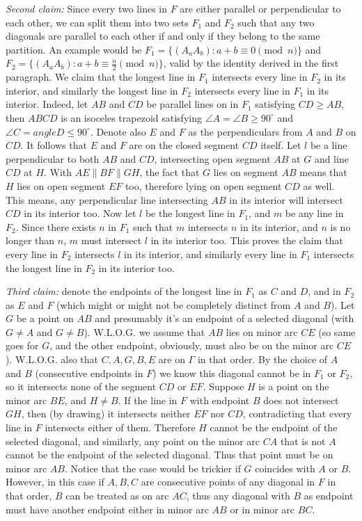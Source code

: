\documentclass[11pt,a4paper]{article}
\begin{document}
\begin{itemize}
\emph{Second claim:}
Since every two lines in $F$ are either parallel or perpendicular to each other, 
we can split them into two sets $F_1$ and $F_2$ such that any two diagonals are parallel to each other if and only if they belong to the same partition. 
An example would be $F_1=\{(A_aA_b): a+b\equiv 0\pmod{n}\}$ and $F_2=\{(A_aA_b): a+b\equiv \frac n2\pmod{n}\}$, 
valid by the identity derived in the first paragraph. 
We claim that the longest line in $F_1$ intersects every line in $F_2$ in its interior, and similarly the longest line in $F_2$ intersects every line in $F_1$ in its interior. 
Indeed, let $AB$ and $CD$ be parallel lines on in $F_1$ satisfying $CD\ge AB$, 
then $ABCD$ is an isoceles trapezoid satisfying $\angle A=\angle B\ge 90^{\circ}$ and $\angle C=angle D\le 90^{\circ}$. 
Denote also $E$ and $F$ as the perpendiculars from $A$ and $B$ on $CD$. It follows that $E$ and $F$ are on the closed segment $CD$ itself. 
Let $l$ be a line perpendicular to both $AB$ and $CD$, intersecting open segment $AB$ at $G$ and line $CD$ at $H$. 
With $AE\parallel BF\parallel GH$, the fact that $G$ lies on segment $AB$ means that $H$ lies on open segment $EF$ too, 
therefore lying on open segment $CD$ as well. 
This means, any perpendicular line intersecting $AB$ in its interior will intersect $CD$ in its interior too. 
Now let $l$ be the longest line in $F_1$, and $m$ be any line in $F_2$. Since there exists $n$ in $F_1$ such that $m$ intersects $n$ in its interior, and $n$ is no longer than $n$, $m$ must intersect $l$ in its interior too. This proves the claim that every line in $F_2$ intersects $l$ in its interior, and similarly every line in $F_1$ intersects the longest line in $F_2$ in its interior too. 

\emph{Third claim:} 
denote the endpoints of the longest line in $F_1$ as $C$ and $D$, and in $F_2$ as $E$ and $F$ (which might or might not be completely distinct from $A$ and $B$). 
Let $G$ be a point on $AB$ and presumably it's an endpoint of a selected diagonal (with $G\neq A$ and $G\neq B$). 
W.L.O.G. we assume that $AB$ lies on minor arc $CE$ (so same goes for $G$, and the other endpoint, obviously, must also be on the minor arc $CE$). W.L.O.G. also that $C, A, G, B, E$ are on $\Gamma$ in that order.
By the choice of $A$ and $B$ (consecutive endpoints in $F$) we know this diagonal cannot be in $F_1$ or $F_2$, so it intersects 
none of the segment $CD$ or $EF$. 
Suppose $H$ is a point on the minor arc $BE$, and $H\neq B$. If the line in $F$ with endpoint $B$ does not intersect $GH$, 
then (by drawing) it intersects neither $EF$ nor $CD$, contradicting that every line in $F$ intersects either of them. 
Therefore $H$ cannot be the endpoint of the selected diagonal, and similarly, any point on the minor arc $CA$ that is not $A$ cannot be the endpoint of the selected diagonal. Thus that point must be on minor arc $AB$. 
Notice that the case would be trickier if $G$ coincides with $A$ or $B$. 
However, in this case if $A, B, C$ are consecutive points of any diagonal in $F$ in that order, $B$ can be treated as on arc $AC$, thus any diagonal with $B$ as endpoint must have another endpoint either in minor arc $AB$ or in minor arc $BC$. 


\end{itemize}
\end{document}
